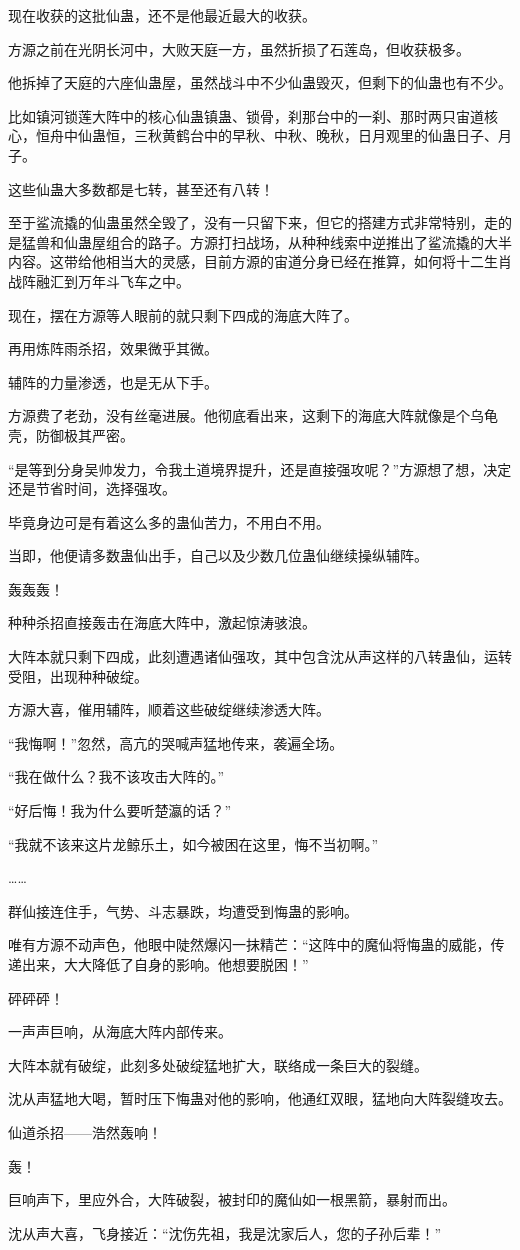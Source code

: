 \begin{this_body}
现在收获的这批仙蛊，还不是他最近最大的收获。

方源之前在光阴长河中，大败天庭一方，虽然折损了石莲岛，但收获极多。

他拆掉了天庭的六座仙蛊屋，虽然战斗中不少仙蛊毁灭，但剩下的仙蛊也有不少。

比如镇河锁莲大阵中的核心仙蛊镇蛊、锁骨，刹那台中的一刹、那时两只宙道核心，恒舟中仙蛊恒，三秋黄鹤台中的早秋、中秋、晚秋，日月观里的仙蛊日子、月子。

这些仙蛊大多数都是七转，甚至还有八转！

至于鲨流撬的仙蛊虽然全毁了，没有一只留下来，但它的搭建方式非常特别，走的是猛兽和仙蛊屋组合的路子。方源打扫战场，从种种线索中逆推出了鲨流撬的大半内容。这带给他相当大的灵感，目前方源的宙道分身已经在推算，如何将十二生肖战阵融汇到万年斗飞车之中。

现在，摆在方源等人眼前的就只剩下四成的海底大阵了。

再用炼阵雨杀招，效果微乎其微。

辅阵的力量渗透，也是无从下手。

方源费了老劲，没有丝毫进展。他彻底看出来，这剩下的海底大阵就像是个乌龟壳，防御极其严密。

“是等到分身吴帅发力，令我土道境界提升，还是直接强攻呢？”方源想了想，决定还是节省时间，选择强攻。

毕竟身边可是有着这么多的蛊仙苦力，不用白不用。

当即，他便请多数蛊仙出手，自己以及少数几位蛊仙继续操纵辅阵。

轰轰轰！

种种杀招直接轰击在海底大阵中，激起惊涛骇浪。

大阵本就只剩下四成，此刻遭遇诸仙强攻，其中包含沈从声这样的八转蛊仙，运转受阻，出现种种破绽。

方源大喜，催用辅阵，顺着这些破绽继续渗透大阵。

“我悔啊！”忽然，高亢的哭喊声猛地传来，袭遍全场。

“我在做什么？我不该攻击大阵的。”

“好后悔！我为什么要听楚瀛的话？”

“我就不该来这片龙鲸乐土，如今被困在这里，悔不当初啊。”

……

群仙接连住手，气势、斗志暴跌，均遭受到悔蛊的影响。

唯有方源不动声色，他眼中陡然爆闪一抹精芒：“这阵中的魔仙将悔蛊的威能，传递出来，大大降低了自身的影响。他想要脱困！”

砰砰砰！

一声声巨响，从海底大阵内部传来。

大阵本就有破绽，此刻多处破绽猛地扩大，联络成一条巨大的裂缝。

沈从声猛地大喝，暂时压下悔蛊对他的影响，他通红双眼，猛地向大阵裂缝攻去。

仙道杀招——浩然轰响！

轰！

巨响声下，里应外合，大阵破裂，被封印的魔仙如一根黑箭，暴射而出。

沈从声大喜，飞身接近：“沈伤先祖，我是沈家后人，您的子孙后辈！”

\end{this_body}

